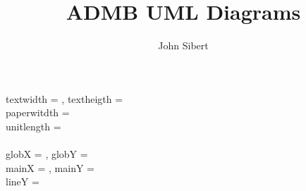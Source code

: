 \documentclass[letterpaper,12pt]{article}
\title{ADMB UML Diagrams}
\author{John Sibert}
\begin{document}
\noindent
textwidth = \the\textwidth , textheigth = \the\textheight\\
paperwitdth = \the\paperwidth\\ %
\setlength{\unitlength}{0.01\textwidth}
unitlength = \the\unitlength\\
\FPeval{\globY}{\number\textheight / \number\unitlength}\\
\FPeval{\globX}{\number\textwidth / \number\unitlength}
globX = \FPprint{\globX} , globY = \FPprint{\globY}\\
mainX = \FPprint{\mainX} , mainY = \FPprint{\mainY}\\
lineY = \lineY


\sffamily
\end{document}
